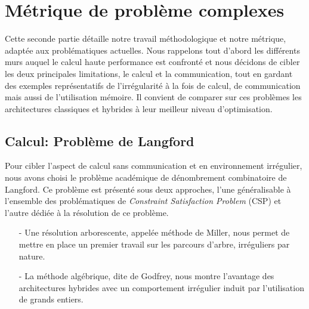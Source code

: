\documentclass[12pt,a4paper]{report}
\begin{document}
\section{Métrique de problème complexes}
Cette seconde partie détaille notre travail méthodologique et notre métrique, adaptée aux problématiques actuelles. 
Nous rappelons tout d'abord les différents murs auquel le calcul haute performance est confronté et nous décidons de cibler les deux principales limitations, le calcul et la communication, tout en gardant des exemples représentatifs de l'irrégularité à la fois de calcul, de communication mais aussi de l'utilisation mémoire. 
Il convient de comparer sur ces problèmes les architectures classiques et hybrides à leur meilleur niveau d'optimisation.




\subsection{Calcul: Problème de Langford}
Pour cibler l'aspect de calcul sans communication et en environnement irrégulier, nous avons choisi le problème académique de dénombrement combinatoire de Langford.
Ce problème est présenté sous deux approches, l'une généralisable à l'ensemble des problématiques de \textit{Constraint Satisfaction Problem} (CSP) et l'autre dédiée à la résolution de ce problème.
\begin{itemize}[noitemsep,nolistsep]
\item[-] Une résolution arborescente, appelée méthode de Miller, nous permet de mettre en place un premier travail sur les parcours d'arbre, irréguliers par nature. 
\item[-] La méthode algébrique, dite de Godfrey, nous montre l'avantage des architectures hybrides avec un comportement irrégulier induit par l'utilisation de grands entiers. \\
\end{itemize}
\end{document}
